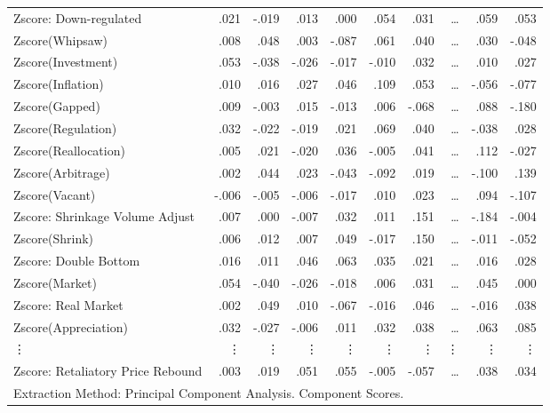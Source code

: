 \documentclass[review,3p,times,12pt,number]{elsarticle}
\begin{document}
\begin{table}[htbp]
\begin{tabular}{rrrrrrrrrr}
    \multicolumn{1}{l}{Zscore:  Down-regulated} & .021  & -.019 & .013  & .000  & .054  & .031  & \ldots     & .059  & .053 \\
    \multicolumn{1}{l}{Zscore(Whipsaw)} & .008  & .048  & .003  & -.087 & .061  & .040  & \ldots    & .030  & -.048 \\
    \multicolumn{1}{l}{Zscore(Investment)} & .053  & -.038 & -.026 & -.017 & -.010 & .032  & \ldots     & .010  & .027 \\
    \multicolumn{1}{l}{Zscore(Inflation)} & .010  & .016  & .027  & .046  & .109  & .053  & \ldots     & -.056 & -.077 \\
    \multicolumn{1}{l}{Zscore(Gapped)} & .009  & -.003 & .015  & -.013 & .006  & -.068 & \ldots     & .088  & -.180 \\
    \multicolumn{1}{l}{Zscore(Regulation)} & .032  & -.022 & -.019 & .021  & .069  & .040  & \ldots     & -.038 & .028 \\
    \multicolumn{1}{l}{Zscore(Reallocation)} & .005  & .021  & -.020 & .036  & -.005 & .041  & \ldots     & .112  & -.027 \\
    \multicolumn{1}{l}{Zscore(Arbitrage)} & .002  & .044  & .023  & -.043 & -.092 & .019  & \ldots     & -.100 & .139 \\
    \multicolumn{1}{l}{Zscore(Vacant)} & -.006 & -.005 & -.006 & -.017 & .010  & .023  & \ldots     & .094  & -.107 \\
    \multicolumn{1}{l}{Zscore:  Shrinkage Volume Adjust} & .007  & .000  & -.007 & .032  & .011  & .151  & \ldots     & -.184 & -.004 \\
    \multicolumn{1}{l}{Zscore(Shrink)} & .006  & .012  & .007  & .049  & -.017 & .150  & \ldots     & -.011 & -.052 \\
    \multicolumn{1}{l}{Zscore:  Double Bottom} & .016  & .011  & .046  & .063  & .035  & .021  & \ldots     & .016  & .028 \\
    \multicolumn{1}{l}{Zscore(Market)} & .054  & -.040 & -.026 & -.018 & .006  & .031  & \ldots     & .045  & .000 \\
    \multicolumn{1}{l}{Zscore:  Real Market} & .002  & .049  & .010  & -.067 & -.016 & .046  & \ldots     & -.016 & .038 \\
    \multicolumn{1}{l}{Zscore(Appreciation)} & .032  & -.027 & -.006 & .011  & .032  & .038  & \ldots     & .063  & .085 \\
    \multicolumn{1}{l}{\vdots} & \vdots     & \vdots     & \vdots     & \vdots     & \vdots     & \vdots     & \vdots     & \vdots     & \vdots \\
    \multicolumn{1}{l}{Zscore:  Retaliatory Price Rebound} & .003  & .019  & .051  & .055  & -.005 & -.057 & \ldots     & .038  & .034 \\
    \multicolumn{10}{l}{Extraction Method: Principal Component Analysis.
 Component Scores.} \\
    \bottomrule
    \end{tabular}%
  \label{tab:weibo:Score Coefficient Matrix}%
\end{table}%
\end{document}
